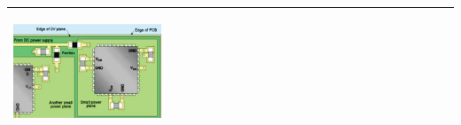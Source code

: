 \begin{table}[h!]
\begin{tabular}{|m{}|m{}|}
					\begin{center}\includegraphics[width=0.35\textwidth]{images/FerriteDecouple2.png}\end{center} 
			\\
			\hline
			\end{tabular}
		\end{table}